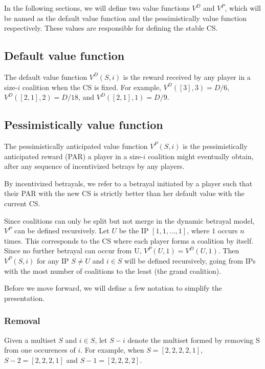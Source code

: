 \documentclass[sigconf,anonymous]{aamas}
\begin{document}
In the following sections, we will define two value functions $V^D$ and $V^P$, which will be named as the default value function and the pessimistically value function respectively. These values are responsible for defining the stable CS. 

\subsection{Default value function}
\label{sec:dv-func}

The default value function $V^D(S, i)$ is the reward received by any player in a size-$i$ coalition when the CS is fixed. 
For example, $V^D([3], 3) = D/6$, $V^D([2, 1], 2) = D/18$, and $V^D([2, 1], 1) = D/9$. 

\subsection{Pessimistically value function}
\label{sec:pv-func}

The pessimistically anticipated value function $V^P(S, i)$ is the pessimistically anticipated reward (PAR) a player in a size-$i$ coalition might eventually obtain, after any sequence of incentivized betrays by any players.

By incentivized betrayals, we refer to a betrayal initiated by a player such that their PAR with the new CS is strictly better than her default value with the current CS. 

Since coalitions can only be split but not merge in the dynamic betrayal model, $V^P$ can be defined recursively. Let $U$ be the IP $[1, 1, \dots, 1]$, where $1$ occurs $n$ times. This corresponds to the CS where each player forms a coalition by itself. Since no further betrayal can occur from U, $V^P(U, 1)=V^D(U, 1)$. Then $V^P(S, i)$ for any IP $S \neq U$ and $i \in S$ will be defined recursively, going from IPs with the most number of coalitions to the least (the grand coalition).

Before we move forward, we will define a few notation to simplify the presentation. 

\subsubsection{Removal}

Given a multiset $S$ and $i\in S$, let $S - i$ denote the multiset formed by removing S from one occurences of $i$. For example, when $S=[2,2,2,2,1] $, $S-2=[2,2,2,1]$ and $S-1=[2,2,2,2]$. 
\end{document}
